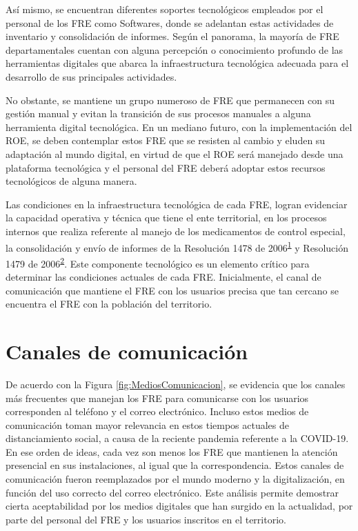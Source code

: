 \documentclass[
  oneside]{book}
\begin{document}
Así mismo, se encuentran diferentes soportes tecnológicos empleados por el personal de los FRE como Softwares, donde se adelantan estas actividades de inventario y consolidación de informes. Según el panorama, la mayoría de FRE departamentales cuentan con alguna percepción o conocimiento profundo de las herramientas digitales que abarca la infraestructura tecnológica adecuada para el desarrollo de sus principales actividades.

No obstante, se mantiene un grupo numeroso de FRE que permanecen con su gestión manual y evitan la transición de sus procesos manuales a alguna herramienta digital tecnológica. En un mediano futuro, con la implementación del ROE, se deben contemplar estos FRE que se resisten al cambio y eluden su adaptación al mundo digital, en virtud de que el ROE será manejado desde una plataforma tecnológica y el personal del FRE deberá adoptar estos recursos tecnológicos de alguna manera.

Las condiciones en la infraestructura tecnológica de cada FRE, logran evidenciar la capacidad operativa y técnica que tiene el ente territorial, en los procesos internos que realiza referente al manejo de los medicamentos de control especial, la consolidación y envío de informes de la Resolución 1478 de 2006\textsuperscript{\protect\hyperlink{ref-MSPS1478-2006}{1}} y Resolución 1479 de 2006\textsuperscript{\protect\hyperlink{ref-MSPS1479-2006}{2}}. Este componente tecnológico es un elemento crítico para determinar las condiciones actuales de cada FRE. Inicialmente, el canal de comunicación que mantiene el FRE con los usuarios precisa que tan cercano se encuentra el FRE con la población del territorio.

\hypertarget{canales-de-comunicaciuxf3n}{%
\section{Canales de comunicación}\label{canales-de-comunicaciuxf3n}}

De acuerdo con la Figura \ref{fig:MediosComunicacion}, se evidencia que los canales más frecuentes que manejan los FRE para comunicarse con los usuarios corresponden al teléfono y el correo electrónico. Incluso estos medios de comunicación toman mayor relevancia en estos tiempos actuales de distanciamiento social, a causa de la reciente pandemia referente a la COVID-19. En ese orden de ideas, cada vez son menos los FRE que mantienen la atención presencial en sus instalaciones, al igual que la correspondencia. Estos canales de comunicación fueron reemplazados por el mundo moderno y la digitalización, en función del uso correcto del correo electrónico. Este análisis permite demostrar cierta aceptabilidad por los medios digitales que han surgido en la actualidad, por parte del personal del FRE y los usuarios inscritos en el territorio.
\end{document}
